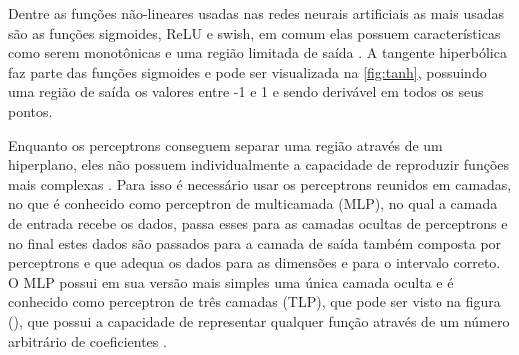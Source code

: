 Dentre as funções não-lineares usadas nas redes neurais artificiais as mais usadas são as funções sigmoides, ReLU e swish, em comum elas possuem características como serem monotônicas e uma região limitada de saída \cite{Szandaa2020}. A tangente hiperbólica faz parte das funções sigmoides e pode ser visualizada na \autoref{fig:tanh}, possuindo uma região de saída os valores entre -1 e 1 e sendo derivável em todos os seus pontos.


Enquanto os perceptrons conseguem separar uma região através de um hiperplano, eles não possuem individualmente a capacidade de reproduzir funções mais complexas \cite{haykin1999neural}. Para isso é necessário usar os perceptrons reunidos em camadas, no que é conhecido como perceptron de multicamada (MLP), no qual a camada de entrada recebe os dados, passa esses para as camadas ocultas de perceptrons e no final estes dados são passados para a camada de saída também composta por perceptrons e que adequa os dados para as dimensões e para o intervalo correto. O MLP possui em sua versão mais simples uma única camada oculta e é conhecido como perceptron de três camadas (TLP), que pode ser visto na figura (), que possui a capacidade de representar qualquer função através de um número arbitrário de coeficientes \cite{Hornik1991}.
\ExplSyntaxOn
{}
\ExplSyntaxOff
\def\layersep{2cm}
\storedata{}

